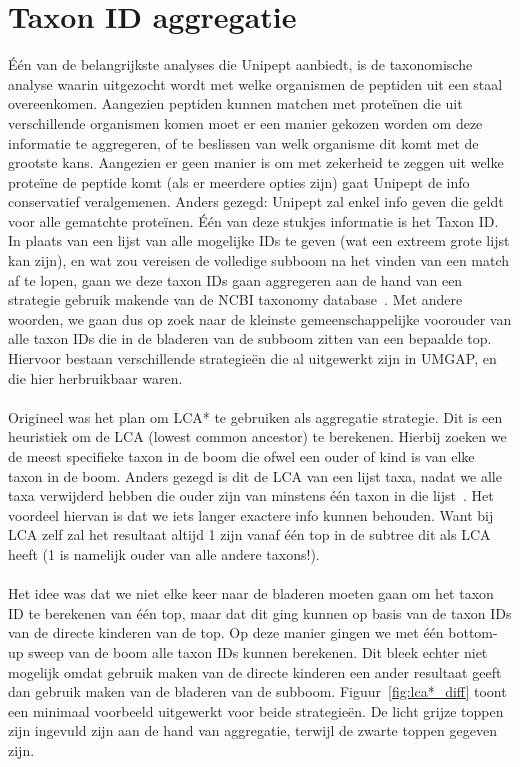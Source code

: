 \section{Taxon ID aggregatie}\label{sec:taxon-id-aggregatie}
Één van de belangrijkste analyses die Unipept aanbiedt, is de taxonomische analyse waarin uitgezocht wordt met welke organismen de peptiden uit een staal overeenkomen.
Aangezien peptiden kunnen matchen met proteïnen die uit verschillende organismen komen moet er een manier gekozen worden om deze informatie te aggregeren, of te beslissen van welk organisme dit komt met de grootste kans.
Aangezien er geen manier is om met zekerheid te zeggen uit welke proteïne de peptide komt (als er meerdere opties zijn) gaat Unipept de info conservatief veralgemenen.
Anders gezegd: Unipept zal enkel info geven die geldt voor alle gematchte proteïnen.
Één van deze stukjes informatie is het Taxon ID\@.
In plaats van een lijst van alle mogelijke IDs te geven (wat een extreem grote lijst kan zijn), en wat zou vereisen de volledige subboom na het vinden van een match af te lopen, gaan we deze taxon IDs gaan aggregeren aan de hand van een strategie gebruik makende van de NCBI taxonomy database~\cite{NCBI_original_article, NCBI_update}.
Met andere woorden, we gaan dus op zoek naar de kleinste gemeenschappelijke voorouder van alle taxon IDs die in de bladeren van de subboom zitten van een bepaalde top.
Hiervoor bestaan verschillende strategieën die al uitgewerkt zijn in UMGAP, en die hier herbruikbaar waren.
\\ \\
Origineel was het plan om LCA* te gebruiken als aggregatie strategie.
Dit is een heuristiek om de LCA (lowest common ancestor) te berekenen.
Hierbij zoeken we de meest specifieke taxon in de boom die ofwel een ouder of kind is van elke taxon in de boom.
Anders gezegd is dit de LCA van een lijst taxa, nadat we alle taxa verwijderd hebben die ouder zijn van minstens één taxon in die lijst~\cite{UMGAP_paper}.
Het voordeel hiervan is dat we iets langer exactere info kunnen behouden.
Want bij LCA zelf zal het resultaat altijd 1 zijn vanaf één top in de subtree dit als LCA heeft (1 is namelijk ouder van alle andere taxons!).
\\ \\
Het idee was dat we niet elke keer naar de bladeren moeten gaan om het taxon ID te berekenen van één top, maar dat dit ging kunnen op basis van de taxon IDs van de directe kinderen van de top.
Op deze manier gingen we met één bottom-up sweep van de boom alle taxon IDs kunnen berekenen.
Dit bleek echter niet mogelijk omdat gebruik maken van de directe kinderen een ander resultaat geeft dan gebruik maken van de bladeren van de subboom.
Figuur~\ref{fig:lca*_diff} toont een minimaal voorbeeld uitgewerkt voor beide strategieën.
De licht grijze toppen zijn ingevuld zijn aan de hand van aggregatie, terwijl de zwarte toppen gegeven zijn.

